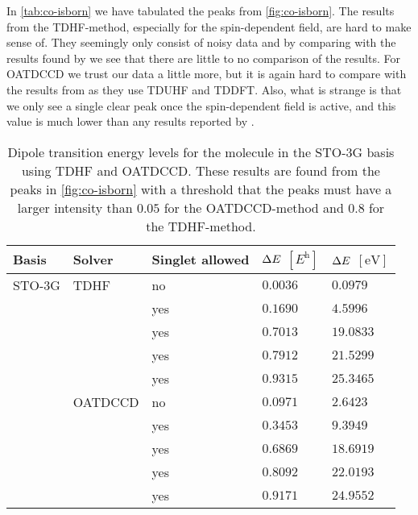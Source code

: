         In \autoref{tab:co-isborn} we have tabulated the peaks from
        \autoref{fig:co-isborn}.
        The results from the TDHF-method, especially for the spin-dependent
        field, are hard to make sense of.
        They seemingly only consist of noisy data and by comparing with the
        results found by \citeauthor{isborn} \cite{isborn} we see that there are
        little to no comparison of the results.
        For OATDCCD we trust our data a little more, but it is again hard to
        compare with the results from \citeauthor{isborn} \cite{isborn} as they
        use TDUHF and TDDFT.
        Also, what is strange is that we only see a single clear peak once the
        spin-dependent field is active, and this value is much lower than any
        results reported by \citeauthor{isborn} \cite{isborn}.
        \begin{table}
            \centering
            \caption{Dipole transition energy levels for the  molecule in
            the STO-3G basis using TDHF and OATDCCD.
            These results are found from the peaks in \autoref{fig:co-isborn}
            with a threshold that the peaks must have a larger intensity than
            $\num{0.05}$ for the OATDCCD-method and $\num{0.8}$ for the
            TDHF-method.}
            \renewcommand{\arraystretch}{1.3}
            \begin{tabular}{@{}lllll@{}}
                \toprule
                Basis & Solver & Singlet allowed
                & $\Delta E$ $[\si{\hartree}]$
                & $\Delta E$ $[\si{\electronvolt}]$
                \\
                \midrule
                STO-3G & TDHF & no & $0.0036$ & $0.0979$ \\
                & & yes & $0.1690$ & $4.5996$ \\
                & & yes & $0.7013$ & $19.0833$ \\
                & & yes & $0.7912$ & $21.5299$ \\
                & & yes & $0.9315$ & $25.3465$ \\
                & OATDCCD & no & $0.0971$ & $2.6423$ \\
                & & yes & $0.3453$ & $9.3949$ \\
                & & yes & $0.6869$ & $18.6919$ \\
                & & yes & $0.8092$ & $22.0193$ \\
                & & yes & $0.9171$ & $24.9552$ \\
                \bottomrule
            \end{tabular}
            \label{tab:co-isborn}
        \end{table}

